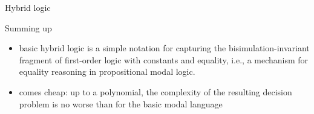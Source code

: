 \documentclass[aspectratio=169]{beamer}
\begin{document}

\begin{slide}{Hybrid logic}\label{s:51a}
\small

\begin{block}{Summing up}
\begin{itemize}
\item basic hybrid logic is a simple notation for capturing  the \alert{bisimulation-invariant fragment of first-order logic with constants and equality}, i.e., a mechanism for equality reasoning in propositional modal logic. 
\item comes \alert{cheap}: up to a polynomial, the complexity of the resulting decision problem is no worse than for the basic modal language
\end{itemize}
\end{block}
\end{slide}



\end{document}
